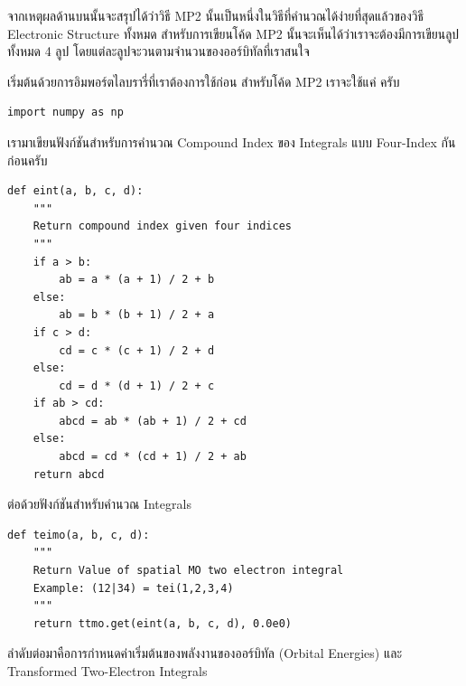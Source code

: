 จากเหตุผลด้านบนนั้นจะสรุปได้ว่าวิธี MP2 นั้นเป็นหนึ่งในวิธีที่คำนวณได้ง่ายที่สุดแล้วของวิธี Electronic Structure ทั้งหมด สำหรับการเขียนโค้ด
MP2 นั้นจะเห็นได้ว่าเราจะต้องมีการเขียนลูปทั้งหมด 4 ลูป โดยแต่ละลูปจะวนตามจำนวนของออร์บิทัลที่เราสนใจ

\vspace{5pt}

\noindent เริ่มต้นด้วยการอิมพอร์ตไลบรารี่ที่เราต้องการใช้ก่อน สำหรับโค้ด MP2 เราจะใช้แค่  ครับ

\vspace{5pt}

\begin{lstlisting}[style=MyPython]
import numpy as np
\end{lstlisting}

\vspace{5pt}

\noindent เรามาเขียนฟังก์ชันสำหรับการคำนวณ Compound Index ของ Integrals แบบ Four-Index กันก่อนครับ

\vspace{5pt}

\begin{lstlisting}[style=MyPython]
def eint(a, b, c, d):
    """
    Return compound index given four indices
    """    
    if a > b:
        ab = a * (a + 1) / 2 + b
    else:
        ab = b * (b + 1) / 2 + a
    if c > d:
        cd = c * (c + 1) / 2 + d
    else:
        cd = d * (d + 1) / 2 + c
    if ab > cd:
        abcd = ab * (ab + 1) / 2 + cd
    else:
        abcd = cd * (cd + 1) / 2 + ab
    return abcd
\end{lstlisting}

\vspace{5pt}

\noindent ต่อด้วยฟังก์ชันสำหรับคำนวณ Integrals

\vspace{5pt}

\begin{lstlisting}[style=MyPython]
def teimo(a, b, c, d):
    """
    Return Value of spatial MO two electron integral
    Example: (12|34) = tei(1,2,3,4)
    """
    return ttmo.get(eint(a, b, c, d), 0.0e0)
\end{lstlisting}

\vspace{5pt}

\noindent ลำดับต่อมาคือการกำหนดค่าเริ่มต้นของพลังงานของออร์บิทัล (Orbital Energies) และ Transformed Two-Electron Integrals

\vspace{5pt}

